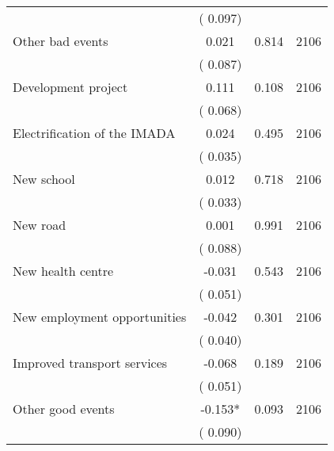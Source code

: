 \begin{tabular}{l*{3}{c}}
                               &        (       0.097)            &                               &                               \\ 
 Other bad events                &              0.021        &        0.814   & 2106              \\ 
                               &        (       0.087)            &                               &                               \\ 
 Development project                &              0.111        &        0.108   & 2106              \\ 
                               &        (       0.068)            &                               &                               \\ 
 Electrification of the IMADA                &              0.024        &        0.495   & 2106              \\ 
                               &        (       0.035)            &                               &                               \\ 
 New school                &              0.012        &        0.718   & 2106              \\ 
                               &        (       0.033)            &                               &                               \\ 
 New road                &              0.001        &        0.991   & 2106              \\ 
                               &        (       0.088)            &                               &                               \\ 
 New health centre                &             -0.031        &        0.543   & 2106              \\ 
                               &        (       0.051)            &                               &                               \\ 
 New employment opportunities                &             -0.042        &        0.301   & 2106              \\ 
                               &        (       0.040)            &                               &                               \\ 
 Improved transport services                &             -0.068        &        0.189   & 2106              \\ 
                               &        (       0.051)            &                               &                               \\ 
 Other good events                &             -0.153*        &        0.093   & 2106              \\ 
                               &        (       0.090)            &                               &                               \\ 
\hline \end{tabular}                                                                                              
